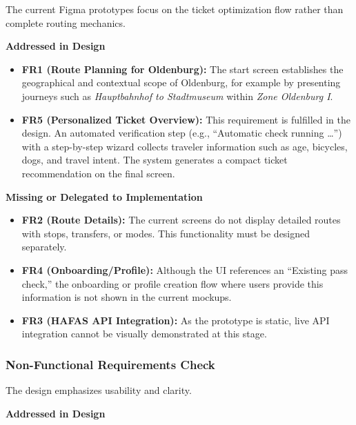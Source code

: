 \documentclass[12pt,a4paper]{article}
\newcommand{\minorheading}[1]{%
    \vspace{0.75em}%
    \noindent\textbf{#1}\par
    \vspace{0.25em}%
}
\begin{document}
The current Figma prototypes focus on the ticket optimization flow rather than complete routing mechanics.

\minorheading{Addressed in Design}

\begin{itemize}
    \item \textbf{FR1 (Route Planning for Oldenburg):}  
    The start screen establishes the geographical and contextual scope of Oldenburg, for example by presenting journeys such as \emph{Hauptbahnhof to Stadtmuseum} within \emph{Zone Oldenburg I}.

    \item \textbf{FR5 (Personalized Ticket Overview):}  
    This requirement is fulfilled in the design. An automated verification step (e.g., ``Automatic check running \dots'') with a step-by-step wizard collects traveler information such as age, bicycles, dogs, and travel intent. The system generates a compact ticket recommendation on the final screen.
\end{itemize}

\minorheading{Missing or Delegated to Implementation}

\begin{itemize}
    \item \textbf{FR2 (Route Details):}  
    The current screens do not display detailed routes with stops, transfers, or modes. This functionality must be designed separately.

    \item \textbf{FR4 (Onboarding/Profile):}  
    Although the UI references an ``Existing pass check,'' the onboarding or profile creation flow where users provide this information is not shown in the current mockups.

    \item \textbf{FR3 (HAFAS API Integration):}  
    As the prototype is static, live API integration cannot be visually demonstrated at this stage.
\end{itemize}

\subsubsection{Non-Functional Requirements Check}

The design emphasizes usability and clarity.

\minorheading{Addressed in Design}
\end{document}
